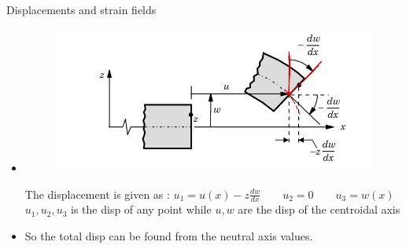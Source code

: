 	\begin{frame}{Displacements and strain fields}
		\begin{itemize}
			\item 		
			\begin{figure}
				\centering
				\includegraphics[width=0.7\linewidth]{Figure/fig17} 		
			\end{figure}
			The displacement is given as : $u_1 = u(x) - z\frac{d w}{d x} \qquad u_2 = 0 \qquad u_3 = w(x)$ \\
			$u_1,u_2,u_3$ is the disp of any point while $u,w$ are the disp of the centroidal axis \\
			\item So the total disp can be found from the neutral axis values. 		
			
		\end{itemize}
	\end{frame}


